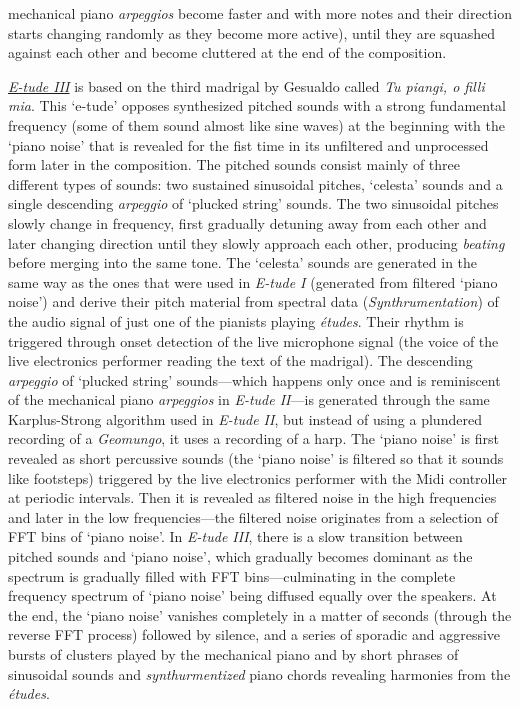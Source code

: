 mechanical piano \emph{arpeggios} become faster and with more notes and their direction starts changing randomly as they become more active), until they are squashed against each other and become cluttered at the end of the composition.

\href{http://www.federicoreuben.com/media/audio/mp3/CompositionsPhD/03%20E-tude%20III.mp3}{\emph{E-tude III}} is based on the third madrigal by Gesualdo called \emph{Tu piangi, o filli mia}. This `e-tude' opposes synthesized pitched sounds with a strong fundamental frequency (some of them sound almost like sine waves) at the beginning with the `piano noise' that is revealed for the fist time in its unfiltered and unprocessed form later in the composition. The pitched sounds consist mainly of three different types of sounds: two sustained sinusoidal pitches, `celesta' sounds and a single descending \emph{arpeggio} of `plucked string' sounds. The two sinusoidal pitches slowly change in frequency, first gradually detuning away from each other and later changing direction until they slowly approach each other, producing \emph{beating} before merging into the same tone. The `celesta' sounds are generated in the same way as the ones that were used in \emph{E-tude I} (generated from filtered `piano noise') and derive their pitch material from spectral data (\emph{Synthrumentation}) of the audio signal of just one of the pianists playing \emph{\'{e}tudes}. Their rhythm is triggered through onset detection of the live microphone signal (the voice of the live electronics performer reading the text of the madrigal). The descending \emph{arpeggio} of `plucked string' sounds---which happens only once and is reminiscent of the mechanical piano \emph{arpeggios} in \emph{E-tude II}---is generated through the same Karplus-Strong algorithm used in \emph{E-tude II}, but instead of using a plundered recording of a \emph{Geomungo}, it uses a recording of a harp. The `piano noise' is first revealed as short percussive sounds (the `piano noise' is filtered so that it sounds like footsteps) triggered by the live electronics performer with the Midi controller at periodic intervals. Then it is revealed as filtered noise in the high frequencies and later in the low frequencies---the filtered noise originates from a selection of FFT bins of `piano noise'. In \emph{E-tude III}, there is a slow transition between pitched sounds and `piano noise', which gradually becomes dominant as the spectrum is gradually filled with FFT bins---culminating in the complete frequency spectrum of `piano noise' being diffused equally over the speakers. At the end, the `piano noise' vanishes completely in a matter of seconds (through the reverse FFT process) followed by silence, and a series of sporadic and aggressive bursts of clusters played by the mechanical piano and by short phrases of sinusoidal sounds and \emph{synthurmentized} piano chords revealing harmonies from the \emph{\'{e}tudes}. 

